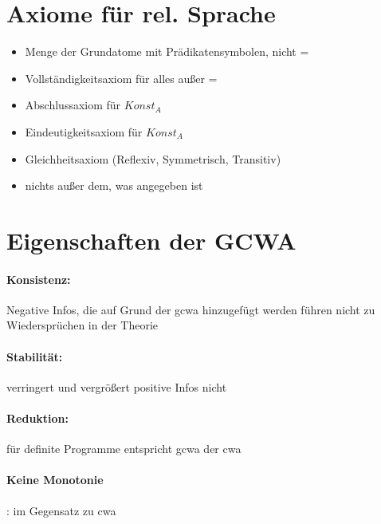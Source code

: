 \documentclass[12pt, a4paper]{article}
\begin{document}
\section*{Axiome für rel. Sprache}
\begin{itemize}
\item Menge der Grundatome mit Prädikatensymbolen, nicht =
\item Vollständigkeitsaxiom für alles außer =
\item Abschlussaxiom für $Konst_A$
\item Eindeutigkeitsaxiom für $Konst_A$
\item Gleichheitsaxiom (Reflexiv, Symmetrisch, Transitiv)
\item nichts außer dem, was angegeben ist
\end{itemize}

\section*{Eigenschaften der GCWA}
\paragraph{Konsistenz:} Negative Infos, die auf Grund der gcwa hinzugefügt werden führen nicht zu Wiedersprüchen in der Theorie\\
\paragraph{Stabilität:} verringert und vergrößert positive Infos nicht \\
\paragraph*{Reduktion:} für definite Programme entspricht gcwa der cwa
\paragraph{Keine Monotonie}: im Gegensatz zu cwa
\end{document}
